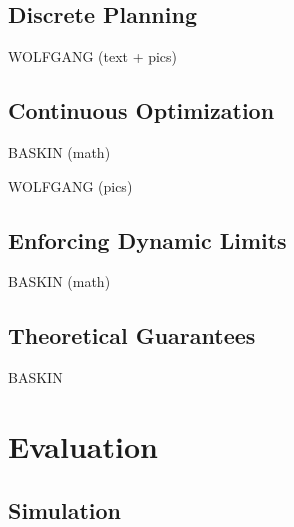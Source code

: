 \documentclass{svproc}
\begin{document}
\subsection{Discrete Planning}

WOLFGANG (text + pics)


\subsection{Continuous Optimization}

BASKIN (math)

WOLFGANG (pics)


\subsection{Enforcing Dynamic Limits} %

BASKIN (math)


\subsection{Theoretical Guarantees} %

BASKIN

\section{Evaluation}

\cite{cvxgen}
\cite{qpOASES}
\cite{osqp}


\subsection{Simulation}
\end{document}
